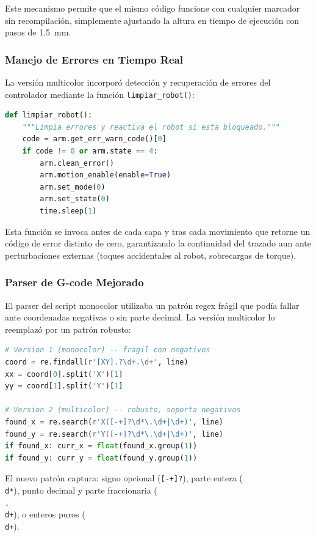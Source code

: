 \documentclass[journal,compsoc]{IEEEtran}
\begin{document}
Este mecanismo permite que el mismo código funcione con cualquier marcador sin recompilación, simplemente ajustando la altura en tiempo de ejecución con pasos de 1.5~mm.

\subsubsection{Manejo de Errores en Tiempo Real}

La versión multicolor incorporó detección y recuperación de errores del controlador mediante la función \texttt{limpiar\_robot()}:

\begin{lstlisting}[language=Python, caption=Función de recuperación de errores del controlador.]
def limpiar_robot():
    """Limpia errores y reactiva el robot si esta bloqueado."""
    code = arm.get_err_warn_code()[0]
    if code != 0 or arm.state == 4:
        arm.clean_error()
        arm.motion_enable(enable=True)
        arm.set_mode(0)
        arm.set_state(0)
        time.sleep(1)
\end{lstlisting}

Esta función se invoca antes de cada capa y tras cada movimiento que retorne un código de error distinto de cero, garantizando la continuidad del trazado aun ante perturbaciones externas (toques accidentales al robot, sobrecargas de torque).

\subsubsection{Parser de G-code Mejorado}

El parser del script monocolor utilizaba un patrón regex frágil que podía fallar ante coordenadas negativas o sin parte decimal. La versión multicolor lo reemplazó por un patrón robusto:

\begin{lstlisting}[language=Python, caption=Comparación entre parsers de coordenadas.]
# Version 1 (monocolor) -- fragil con negativos
coord = re.findall(r'[XY].?\d+.\d+', line)
xx = coord[0].split('X')[1]
yy = coord[1].split('Y')[1]

# Version 2 (multicolor) -- robusto, soporta negativos
found_x = re.search(r'X([-+]?\d*\.\d+|\d+)', line)
found_y = re.search(r'Y([-+]?\d*\.\d+|\d+)', line)
if found_x: curr_x = float(found_x.group(1))
if found_y: curr_y = float(found_y.group(1))
\end{lstlisting}

El nuevo patrón captura: signo opcional (\texttt{[-+]?}), parte entera (\texttt{\\d*}), punto decimal y parte fraccionaria (\texttt{\\.\\d+}), o enteros puros (\texttt{\\d+}).
\end{document}
